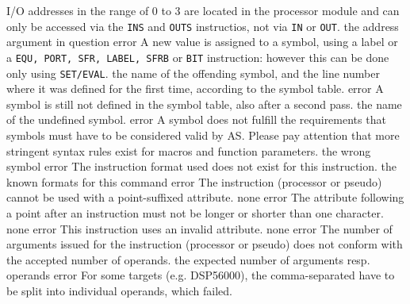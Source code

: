 \documentclass[12pt,twoside]{report}
\newcommand{\tty}[1]{{\tt #1}}
\newcommand{\asname}{{AS}}
\begin{document}
\begin{description}
               {I/O addresses in the range of 0 to 3 are located in the
                processor module and can only be accessed via the {\tt INS}
                and {\tt OUTS} instructios, not via {\tt IN} or {\tt OUT}.}
               {the address argument in question}
               {error}
               {A new value is assigned to a symbol, using a label or a
                \tty{EQU, PORT, SFR, LABEL, SFRB} or \tty{BIT} instruction: however this
                can be done only using \tty{SET/EVAL}.}
               {the name of the offending symbol, and the line number where
                it was defined for the first time, according to the symbol
                table.}
               {error}
               {A symbol is still not defined in the symbol table, also
                after a second pass.}
               {the name of the undefined symbol.}
               {error}
               {A symbol does not fulfill the requirements that symbols
                must have to be considered valid by \asname{}. Please pay
                attention that more stringent syntax rules exist for
                macros and function parameters.}
               {the wrong symbol}
               {error}
               {The instruction format used does not exist for this
                instruction.}
               {the known formats for this command}
               {error}
               {The instruction (processor or pseudo) cannot be used with a
                point-suffixed attribute.}
               {none}
               {error}
               {The attribute following a point after an instruction must
                not be longer or shorter than one character.}
               {none}
               {error}
               {This instruction uses an invalid attribute.}
               {none}
               {error}
               {The number of arguments issued for the instruction (processor or
                pseudo) does not conform with the accepted number of
                operands.}
               {the expected number of arguments resp. operands}
               {error}
               {For some targets (e.g. DSP56000), the
                comma-separated have to be split into individual
                operands, which failed.}

\end{description}
\end{document}
